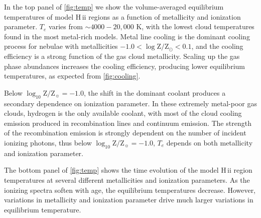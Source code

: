 \documentclass[trackchanges, twocolumn, tighten]{aastex61}
\newcommand{\Fig}[1]{\autoref{fig:#1}}
\newcommand{\logten}{\ensuremath{\log_{10}}}
\newcommand{\Te}{\ensuremath{T_{e}}}
\newcommand{\hii}{H\,{\sc ii}\xspace}
\newcommand{\logZeq}[1]{\ensuremath{\logten \mathrm{Z}/\mathrm{Z}_{\sun} = #1}}
\begin{document}
In the top panel of \Fig{temp} we show the volume-averaged equilibrium temperatures of model \hii regions as a function of metallicity and ionization parameter. \Te{} varies from $\sim 4000-20,000$ K, with the lowest cloud temperatures found in the most metal-rich models. Metal line cooling is the dominant cooling process for nebulae with metallicities $-1.0 < \log \mathrm{Z}/\mathrm{Z}_{\odot} < 0.1$, and the cooling efficiency is a strong function of the gas cloud metallicity. Scaling up the gas phase abundances increases the cooling efficiency, producing lower equilibrium temperatures, as expected from \Fig{cooling}.

Below \logZeq{-1.0}, the shift in the dominant coolant produces a secondary dependence on ionization parameter. In these extremely metal-poor gas clouds, hydrogen is the only available coolant, with most of the cloud cooling emission produced in recombination lines and continuum emission. The strength of the recombination emission is strongly dependent on the number of incident ionizing photons, thus below \logZeq{-1.0}, \Te{} depends on both metallicity and ionization parameter.

The bottom panel of \Fig{temp} shows the time evolution of the model \hii region temperatures at several different metallicities and ionization parameters. As the ionizing spectra soften with age, the equilibrium temperatures decrease. However, variations in metallicity and ionization parameter drive much larger variations in equilibrium temperature.
\end{document}
